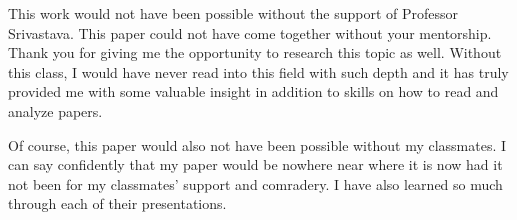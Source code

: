 \documentclass[sigconf]{acmart}
\begin{document}
\begin{acks}
This work would not have been possible without the support of Professor Srivastava. This paper could not have come together without your mentorship. Thank you for giving me the opportunity to
research this topic as well. Without this class, I would have never read into this field with such 
depth and it has truly provided me with some valuable insight in addition to skills on 
how to read and analyze papers. 

Of course, this paper would also not have been possible without my classmates. I can say 
confidently that my paper would be nowhere near where it is now had it not 
been for my classmates' support and comradery. I have also learned so much through 
each of their presentations. 
\end{acks}



\end{document}
